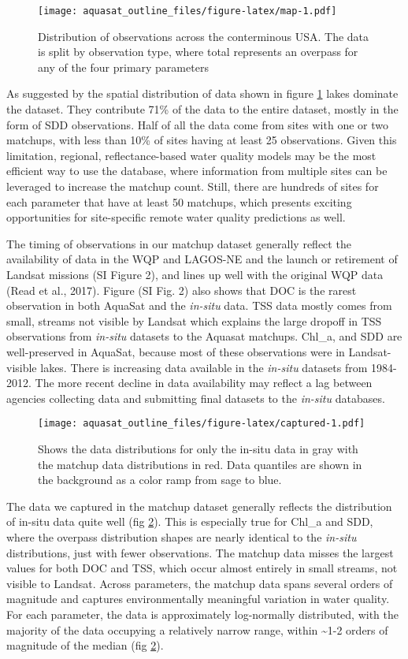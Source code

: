 \documentclass[]{article}
\begin{document}
\begin{figure}
\centering
\texttt{[image: aquasat\_outline\_files/figure-latex/map-1.pdf]}
\caption{\label{fig:map} Distribution of observations across the
conterminous USA. The data is split by observation type, where total
represents an overpass for any of the four primary parameters}
\end{figure}

As suggested by the spatial distribution of data shown in figure
\ref{fig:map} lakes dominate the dataset. They contribute 71\% of the
data to the entire dataset, mostly in the form of SDD observations. Half
of all the data come from sites with one or two matchups, with less than
10\% of sites having at least 25 observations. Given this limitation,
regional, reflectance-based water quality models may be the most
efficient way to use the database, where information from multiple sites
can be leveraged to increase the matchup count. Still, there are
hundreds of sites for each parameter that have at least 50 matchups,
which presents exciting opportunities for site-specific remote water
quality predictions as well.

The timing of observations in our matchup dataset generally reflect the
availability of data in the WQP and LAGOS-NE and the launch or
retirement of Landsat missions (SI Figure 2), and lines up well with the
original WQP data (Read et al., 2017). Figure (SI Fig. 2) also shows
that DOC is the rarest observation in both AquaSat and the
\emph{in-situ} data. TSS data mostly comes from small, streams not
visible by Landsat which explains the large dropoff in TSS observations
from \emph{in-situ} datasets to the Aquasat matchups. Chl\_a, and SDD
are well-preserved in AquaSat, because most of these observations were
in Landsat-visible lakes. There is increasing data available in the
\emph{in-situ} datasets from 1984-2012. The more recent decline in data
availability may reflect a lag between agencies collecting data and
submitting final datasets to the \emph{in-situ} databases.

\begin{figure}
\centering
\texttt{[image: aquasat\_outline\_files/figure-latex/captured-1.pdf]}
\caption{\label{fig:captured} Shows the data distributions for only the
in-situ data in gray with the matchup data distributions in red. Data
quantiles are shown in the background as a color ramp from sage to
blue.}
\end{figure}

The data we captured in the matchup dataset generally reflects the
distribution of in-situ data quite well (fig \ref{fig:captured}). This
is especially true for Chl\_a and SDD, where the overpass distribution
shapes are nearly identical to the \emph{in-situ} distributions, just
with fewer observations. The matchup data misses the largest values for
both DOC and TSS, which occur almost entirely in small streams, not
visible to Landsat. Across parameters, the matchup data spans several
orders of magnitude and captures environmentally meaningful variation in
water quality. For each parameter, the data is approximately
log-normally distributed, with the majority of the data occupying a
relatively narrow range, within \textasciitilde{}1-2 orders of magnitude
of the median (fig \ref{fig:captured}).
\end{document}
